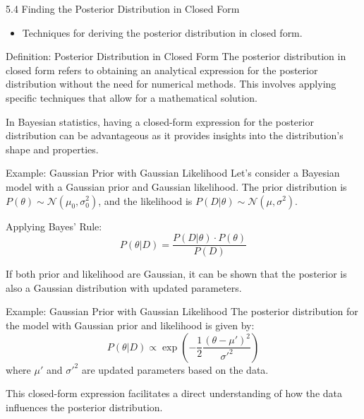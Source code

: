 \documentclass{beamer}
\begin{document}
\begin{frame}{5.4 Finding the Posterior Distribution in Closed Form}
  \begin{itemize}
    \item Techniques for deriving the posterior distribution in closed form.
  \end{itemize}
\end{frame}


\begin{frame}{Definition: Posterior Distribution in Closed Form}
  The posterior distribution in closed form refers to obtaining an analytical expression for the posterior distribution without the need for numerical methods. This involves applying specific techniques that allow for a mathematical solution.

  \vspace{0.5cm}

  In Bayesian statistics, having a closed-form expression for the posterior distribution can be advantageous as it provides insights into the distribution's shape and properties.

\end{frame}

\begin{frame}{Example: Gaussian Prior with Gaussian Likelihood}
  Let's consider a Bayesian model with a Gaussian prior and Gaussian likelihood. The prior distribution is \(P(\theta) \sim \mathcal{N}(\mu_0, \sigma_0^2)\), and the likelihood is \(P(D|\theta) \sim \mathcal{N}(\mu, \sigma^2)\).

  \vspace{0.5cm}

  Applying Bayes' Rule:
  \[
    P(\theta|D) = \frac{P(D|\theta) \cdot P(\theta)}{P(D)}
  \]

  If both prior and likelihood are Gaussian, it can be shown that the posterior is also a Gaussian distribution with updated parameters.

\end{frame}

\begin{frame}{Example: Gaussian Prior with Gaussian Likelihood}
  The posterior distribution for the model with Gaussian prior and likelihood is given by:
  \[
    P(\theta|D) \propto \exp\left(-\frac{1}{2} \frac{(\theta - \mu')^2}{\sigma'^2}\right)
  \]
  where \(\mu'\) and \(\sigma'^2\) are updated parameters based on the data.

  \vspace{0.5cm}

  This closed-form expression facilitates a direct understanding of how the data influences the posterior distribution.

\end{frame}
\end{document}

